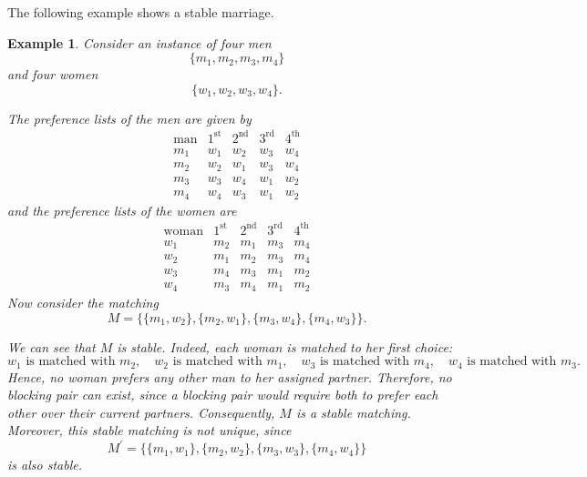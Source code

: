 \documentclass[12pt]{report}
\newtheorem{eexample}[base]{Example}
\numberwithin{algorithm}{chapter}
\begin{document}
	The following example shows a stable marriage.
	\begin{eexample}
		Consider an instance of four men
		\[
		\{m_{1},m_{2},m_{3},m_{4}\}
		\]
		and four women
		\[
		\{w_{1},w_{2},w_{3},w_{4}\}.
		\]
		
		The preference lists of the men are given by
		\[
		\begin{array}{c|cccc}
			\text{man} & 1^{\text{st}} & 2^{\text{nd}} & 3^{\text{rd}} & 4^{\text{th}} \\ \hline
			m_{1} & w_{1} & w_{2} & w_{3} & w_{4} \\
			m_{2} & w_{2} & w_{1} & w_{3} & w_{4} \\
			m_{3} & w_{3} & w_{4} & w_{1} & w_{2} \\
			m_{4} & w_{4} & w_{3} & w_{1} & w_{2}
		\end{array}
		\]
		and the preference lists of the women are
		\[
		\begin{array}{c|cccc}
			\text{woman} & 1^{\text{st}} & 2^{\text{nd}} & 3^{\text{rd}} & 4^{\text{th}} \\ \hline
			w_{1} & m_{2} & m_{1} & m_{3} & m_{4} \\
			w_{2} & m_{1} & m_{2} & m_{3} & m_{4} \\
			w_{3} & m_{4} & m_{3} & m_{1} & m_{2} \\
			w_{4} & m_{3} & m_{4} & m_{1} & m_{2}
		\end{array}
		\]
		Now consider the matching
		\[
		M=\{\{m_{1},w_{2}\},\{m_{2},w_{1}\},\{m_{3},w_{4}\},\{m_{4},w_{3}\}\}.
		\]
		
		We can see that $M$ is stable. Indeed, each woman is matched to her first choice:
		\[
		w_{1} \text{ is matched with } m_{2},\quad
		w_{2} \text{ is matched with } m_{1},\quad
		w_{3} \text{ is matched with } m_{4},\quad
		w_{4} \text{ is matched with } m_{3}.
		\]
		Hence, no woman prefers any other man to her assigned partner. Therefore, no blocking pair can exist, since a blocking pair would require both to prefer each other over their current partners. Consequently, $M$ is a stable matching.
		Moreover, this stable matching is not unique, since
		\[
		M^{'}=\{\{m_{1},w_{1}\},\{m_{2},w_{2}\},\{m_{3},w_{3}\},\{m_{4},w_{4}\}\}
		\]
		is also stable.
	\end{eexample}
		
\end{document}
